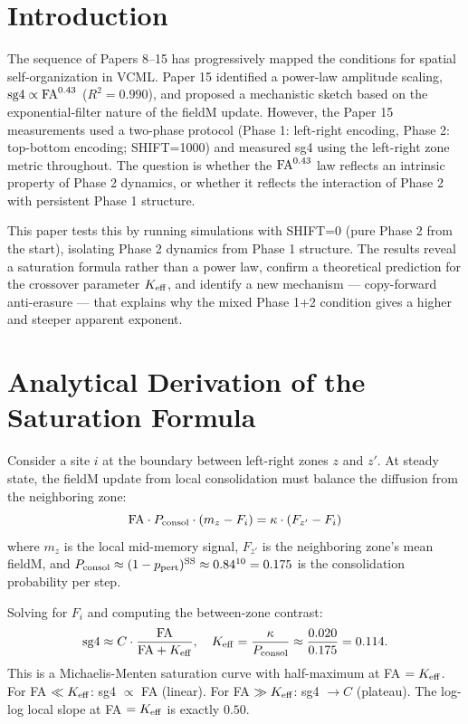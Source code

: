 \documentclass[11pt]{article}
\begin{document}
\section{Introduction}

The sequence of Papers 8--15 has progressively mapped the conditions for
spatial self-organization in VCML.
Paper 15 identified a power-law amplitude scaling, ${\rm sg4} \propto {\rm FA}^{0.43}$
($R^2 = 0.990$), and proposed a mechanistic sketch based on the exponential-filter
nature of the fieldM update.
However, the Paper 15 measurements used a two-phase protocol (Phase 1:
left-right encoding, Phase 2: top-bottom encoding; SHIFT=1000) and measured sg4
using the left-right zone metric throughout.
The question is whether the ${\rm FA}^{0.43}$ law reflects an intrinsic property
of Phase 2 dynamics, or whether it reflects the interaction of Phase 2 with
persistent Phase 1 structure.

This paper tests this by running simulations with SHIFT=0 (pure Phase 2 from
the start), isolating Phase 2 dynamics from Phase 1 structure.
The results reveal a saturation formula rather than a power law, confirm a
theoretical prediction for the crossover parameter $K_{\rm eff}$, and identify
a new mechanism --- copy-forward anti-erasure --- that explains why the
mixed Phase 1+2 condition gives a higher and steeper apparent exponent.

\section{Analytical Derivation of the Saturation Formula}

Consider a site $i$ at the boundary between left-right zones $z$ and $z'$.
At steady state, the fieldM update from local consolidation must balance
the diffusion from the neighboring zone:
\begin{equation}
{\rm FA} \cdot P_{\rm consol} \cdot (m_z - F_i) = \kappa \cdot
(F_{z'} - F_i)
\label{eq:balance}
\end{equation}
where $m_z$ is the local mid-memory signal, $F_{z'}$ is the neighboring
zone's mean fieldM, and $P_{\rm consol} \approx (1-p_{\rm pert})^{{\rm SS}}
\approx 0.84^{10} = 0.175$ is the consolidation probability per step.

Solving for $F_i$ and computing the between-zone contrast:
\begin{equation}
{\rm sg4} \approx C \cdot \frac{{\rm FA}}{{\rm FA} + K_{\rm eff}},
\quad K_{\rm eff} = \frac{\kappa}{P_{\rm consol}} \approx
\frac{0.020}{0.175} = 0.114.
\label{eq:saturation}
\end{equation}
This is a Michaelis-Menten saturation curve with half-maximum at FA $= K_{\rm eff}$.
For FA $\ll K_{\rm eff}$: sg4 $\propto$ FA (linear).
For FA $\gg K_{\rm eff}$: sg4 $\to C$ (plateau).
The log-log local slope at FA $= K_{\rm eff}$ is exactly $0.50$.
\end{document}
